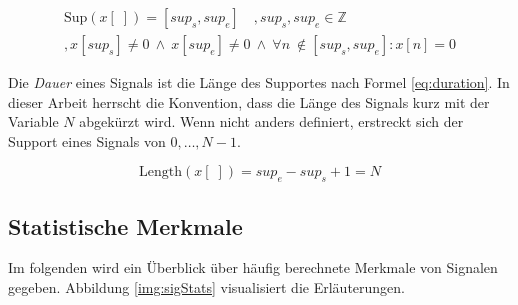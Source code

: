 \begin{equation}
\label{eq:support}
\begin{split}
\text{Sup}(x[\;]) = [sup_s, sup_e] \quad , sup_s, sup_e \in \mathbb{Z} \\,  x[sup_s] \neq 0 \:  \wedge \:  x[sup_e] \neq 0 \: \wedge \: \forall n \
\not\in [sup_s, sup_e] : x[n] = 0
\end{split}
\end{equation}

Die \emph{Dauer} eines Signals ist die Länge des Supportes nach Formel \ref{eq:duration}. In dieser Arbeit herrscht die Konvention, dass die Länge des Signals kurz mit der Variable $N$ abgekürzt wird. Wenn nicht anders definiert, erstreckt sich der Support eines Signals von $0 ,\ldots, N-1$.\cite[S. 24]{dspMichigan}

\begin{equation}
\text{Length}(x[\;]) = sup_e - sup_s + 1 = N
\label{eq:duration}
\end{equation}


\subsection{Statistische Merkmale}

Im folgenden wird ein Überblick über häufig berechnete Merkmale von Signalen gegeben. Abbildung \ref{img:sigStats} visualisiert die Erläuterungen.

